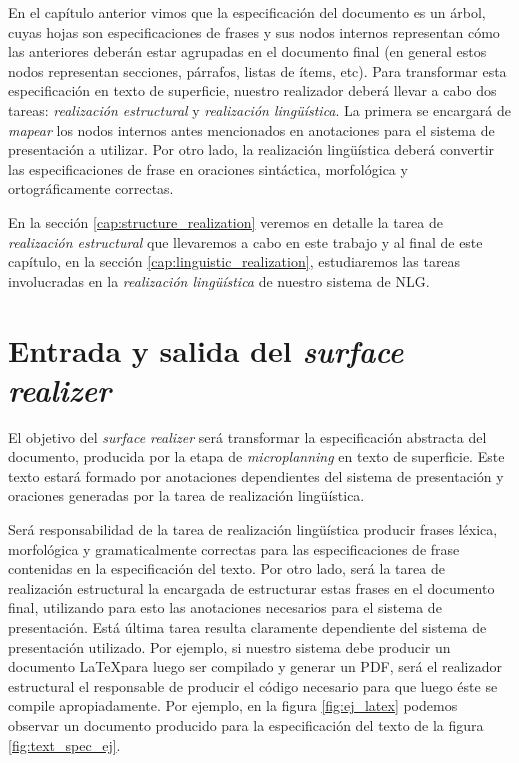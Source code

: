 En el capítulo anterior vimos que la especificación del documento es un árbol, cuyas hojas son especificaciones de frases y sus nodos internos representan cómo las anteriores deberán estar agrupadas en el documento final (en general estos nodos representan secciones, párrafos, listas de ítems, etc). Para transformar esta especificación en texto de superficie, nuestro realizador deberá llevar a cabo dos tareas: \emph{realización estructural} y \emph{realización lingüística}. La primera se encargará de \emph{mapear} los nodos internos antes mencionados en anotaciones para el sistema de presentación a utilizar. Por otro lado, la realización lingüística deberá convertir las especificaciones de frase en oraciones sintáctica, morfológica y ortográficamente correctas.

En la sección \ref{cap:structure_realization} veremos en detalle la tarea de \emph{realización estructural} que llevaremos a cabo en este trabajo y al final de este capítulo, en la sección \ref{cap:linguistic_realization}, estudiaremos las tareas involucradas en la \emph{realización lingüística} de nuestro sistema de NLG.

\section{Entrada y salida del \textit{surface realizer}}

El objetivo del \textit{surface realizer} será transformar la especificación abstracta del documento, producida por la etapa de \textit{microplanning} en texto de superficie. Este texto estará formado por anotaciones dependientes del sistema de presentación y oraciones generadas por la tarea de realización lingüística.

Será responsabilidad de la tarea de realización lingüística producir frases léxica, morfológica y gramaticalmente correctas para las especificaciones de frase contenidas en la especificación del texto. Por otro lado, será la tarea de realización estructural la encargada de estructurar estas frases en el documento final, utilizando para esto las anotaciones necesarios para el sistema de presentación. Está última tarea resulta claramente dependiente del sistema de presentación utilizado. Por ejemplo, si nuestro sistema debe producir un documento \LaTeX para luego ser compilado y generar un PDF, será el realizador estructural el responsable de producir el código necesario para que luego éste se compile apropiadamente. Por ejemplo, en la figura \ref{fig:ej_latex} podemos observar un documento producido para la especificación del texto de la figura \ref{fig:text_spec_ej}.

